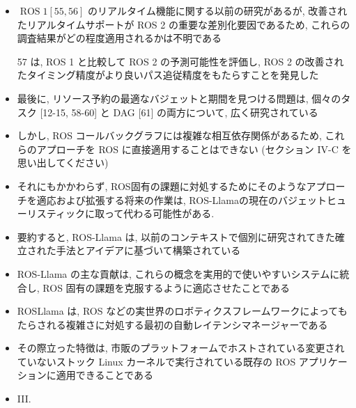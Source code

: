 \begin{frame}{}
    \begin{itemize}
        \item  $\operatorname{ROS} 1[55,56]$ のリアルタイム機能に関する以前の研究があるが, 改善されたリアルタイムサポートが ROS 2 の重要な差別化要因であるため, これらの調査結果がどの程度適用されるかは不明である
\item [57] は, ROS 1 と比較して ROS 2 の予測可能性を評価し, ROS 2 の改善されたタイミング精度がより良いパス追従精度をもたらすことを発見した
    \end{itemize}
\end{frame}

\begin{frame}{}
    \begin{itemize}
        \item  最後に, リソース予約の最適なバジェットと期間を見つける問題は, 個々のタスク [12-15, 58-60] と DAG [61] の両方について, 広く研究されている
\item しかし, ROS コールバックグラフには複雑な相互依存関係があるため, これらのアプローチを ROS に直接適用することはできない (セクション IV-C を思い出してください)
\item それにもかかわらず, ROS固有の課題に対処するためにそのようなアプローチを適応および拡張する将来の作業は, ROS-Llamaの現在のバジェットヒューリスティックに取って代わる可能性がある.
    \end{itemize}
\end{frame}

\begin{frame}{}
    \begin{itemize}
        \item 要約すると, ROS-Llama は, 以前のコンテキストで個別に研究されてきた確立された手法とアイデアに基づいて構築されている
\item ROS-Llama の主な貢献は, これらの概念を実用的で使いやすいシステムに統合し, ROS 固有の課題を克服するように適応させたことである
\item ROSLlama は, ROS などの実世界のロボティクスフレームワークによってもたらされる複雑さに対処する最初の自動レイテンシマネージャーである
\item その際立った特徴は, 市販のプラットフォームでホストされている変更されていないストック Linux カーネルで実行されている既存の ROS アプリケーションに適用できることである
\item III.
    \end{itemize}
\end{frame}
